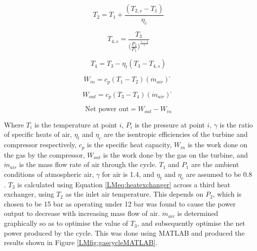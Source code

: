 \documentclass{article}
\begin{document}
\begin{equation}
T_2= T_1+  \frac{(T_{2,s}- T_1)}{\eta_c} 					
\end{equation}

\begin{equation}
T_{4,s}=\frac{T_3}{\Big (\frac{P_2}{P_1} \Big )^{\frac{\gamma-1}{\gamma}}} 			
\end{equation}

\begin{equation}
T_4= T_3- \eta_t (T_3- T_{4,s})				
\end{equation}

\begin{equation}
W_{in} = c_p (T_1- T_2)(\dot m_{air} ) ̇				
\end{equation}

\begin{equation}
W_{out} = c_p (T_3- T_4)(\dot m_{air} ) ̇				
\end{equation}

\begin{equation}
\text {Net power out}=W_{out} - W_{in}		
\end{equation}

Where $T_i$ is the temperature at point $i$, $P_i$ is the pressure at point $i$, $\gamma$ is the ratio of specific heats of air, $\eta_t$ and $\eta_c$ are the isentropic efficiencies of the turbine and compressor respectively, $c_p$ is the specific heat capacity, $W_{in}$ is the work done on the gas by the compressor, $W_{out}$ is the work done by the gas on the turbine, and $\dot m_{air}$ is the mass flow rate of air through the cycle. $T_1$ and $P_1$ are the ambient conditions of atmospheric air, $\gamma$ for air is 1.4, and $\eta_t$ and $\eta_c$ are assumed to be 0.8 \cite{NC}. $T_3$ is calculated using Equation \ref{LMeq:heatexchanger} across a third heat exchanger, using $T_2$ as the inlet air temperature. This depends on $P_2$, which is chosen to be 15 bar as operating under 12 bar was found to cause the power output to decrease with increasing mass flow of air. $\dot m_{air}$ is determined graphically so as to optimise the value of $T_3$, and subsequently optimise the net power produced by the cycle. This was done using MATLAB and produced the results shown in Figure \ref{LMfig:gascycleMATLAB}.\\
\end{document}
